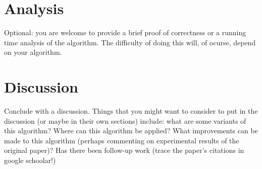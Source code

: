 \documentclass[11pt]{article}
\begin{document}
\section{Analysis}
Optional: you are welcome to provide a brief proof of correctness or a 
running time analysis of the algorithm.  The difficulty of doing this will, of 
ocurse, depend on your algorithm.

\section{Discussion}
Conclude with a discussion.  Things that you might want to consider to put in 
the discussion (or maybe in their own sections) include: what are some variants 
of this algorithm? Where can this algorithm be applied?  What improvements can 
be made to this algorithm (perhaps commenting on experimental results of the 
original paper)?  Has there been follow-up work (trace the paper's citations in 
google schoolar!)
\end{document}
